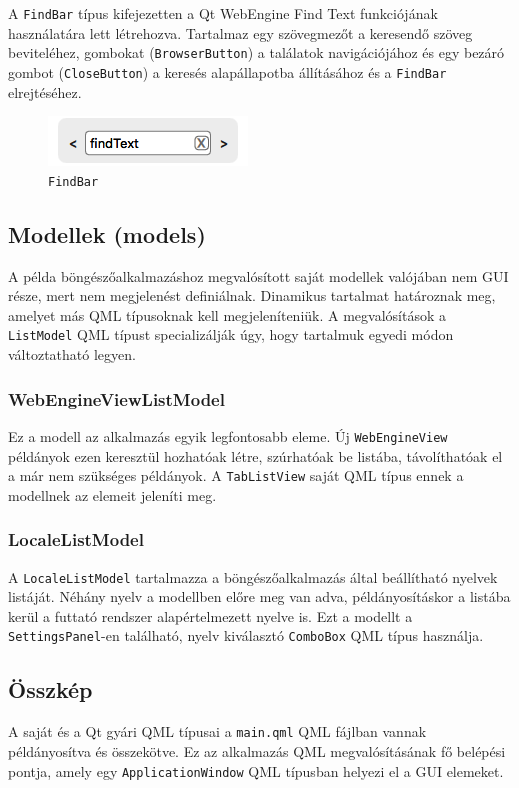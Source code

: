 \documentclass[12pt]{report}
\begin{document}
A \texttt{FindBar} típus kifejezetten a Qt WebEngine Find Text funkciójának használatára
lett létrehozva. Tartalmaz egy szövegmezőt a keresendő szöveg beviteléhez, gombokat
(\texttt{BrowserButton}) a találatok navigációjához és egy bezáró gombot
(\texttt{CloseButton}) a keresés alapállapotba állításához és a \texttt{FindBar}
elrejtéséhez.
\begin{figure}[H]
    \centering
    \includegraphics[scale=0.8]{FindBar}
    \caption{
        \label{fig:find-bar}
        \texttt{FindBar}
    }
\end{figure}

\subsection{Modellek (models)}
A példa böngészőalkalmazáshoz megvalósított saját modellek valójában nem GUI része, mert
nem megjelenést definiálnak. Dinamikus tartalmat határoznak meg, amelyet más QML típusoknak
kell megjeleníteniük. A megvalósítások a \texttt{ListModel} QML típust specializálják úgy,
hogy tartalmuk egyedi módon változtatható legyen.

\subsubsection{WebEngineViewListModel}
Ez a modell az alkalmazás egyik legfontosabb eleme. Új \texttt{WebEngineView} példányok
ezen keresztül hozhatóak létre, szúrhatóak be listába, távolíthatóak el a már nem
szükséges példányok. A \texttt{TabListView} saját QML típus ennek a modellnek az elemeit
jeleníti meg.

\subsubsection{LocaleListModel}
A \texttt{LocaleListModel} tartalmazza a böngészőalkalmazás által beállítható nyelvek
listáját. Néhány nyelv a modellben előre meg van adva, példányosításkor a listába
kerül a futtató rendszer alapértelmezett nyelve is. Ezt a modellt a
\texttt{SettingsPanel}-en található, nyelv kiválasztó \texttt{ComboBox} QML típus használja.

\subsection{Összkép}
A saját és a Qt gyári QML típusai a \texttt{main.qml} QML fájlban vannak példányosítva és
összekötve. Ez az alkalmazás QML megvalósításának fő belépési pontja, amely egy
\texttt{ApplicationWindow} QML típusban helyezi el a GUI elemeket.
\end{document}
